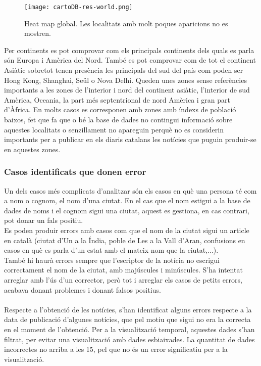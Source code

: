 \documentclass[12pt,a4paper,openright,oneside]{article}
\numberwithin{equation}{section}
\theoremstyle{definition}
\begin{document}
\begin{figure}[!htbp]
\centering
\texttt{[image: cartoDB-res-world.png]}
\caption{Heat map global. Les localitats amb molt poques aparicions no es mostren.}
\end{figure}
\newpage
Per continents es pot comprovar com els principals continents dels quals es parla són Europa i Amèrica del Nord. També es pot comprovar com de tot el continent Asiàtic sobretot tenen presència les principals del sud del país com poden ser Hong Kong, Shanghai, Seül o Nova Delhi. Queden unes zones sense referències importants a les zones de l'interior i nord del continent asiàtic, l'interior de sud Amèrica, Oceania, la part més septentrional de nord Amèrica i gran part d'Àfrica. En molts casos es corresponen amb zones amb índexs de població baixos, fet que fa que o bé la base de dades no contingui informació sobre aquestes localitats o senzillament no apareguin perquè no es considerin importants per a publicar en els diaris catalans les notícies que puguin produir-se en aquestes zones.\\
\subsubsection*{Casos identificats que donen error}
Un dels casos més complicats d'analitzar són els casos en què una persona té com a nom o cognom, el nom d'una ciutat. En el cas que el nom estigui a la base de dades de noms i el cognom sigui una ciutat, aquest es gestiona, en cas contrari, pot donar un fals positiu.\\
Es poden produir errors amb casos com que el nom de la ciutat sigui un article en català (ciutat d'Un a la Índia, poble de Les a la Vall d'Aran, confusions en casos en què es parla d'un estat amb el mateix nom que la ciutat,...).\\
També hi haurà errors sempre que l'escriptor de la notícia no escrigui correctament el nom de la ciutat, amb majúscules i minúscules. S'ha intentat arreglar amb l'ús d'un corrector, però tot i arreglar els casos de petits errors, acabava donant problemes i donant falsos positius.\\\\
Respecte a l'obtenció de les notícies, s'han identificat alguns errors respecte a la data de publicació d'algunes notícies, que pel motiu que sigui no era la correcta en el moment de l'obtenció. Per a la visualització temporal, aquestes dades s'han filtrat, per evitar una visualització amb dades esbiaixades. La quantitat de dades incorrectes no arriba a les 15, pel que no és un error significatiu per a la visualització.
\end{document}
